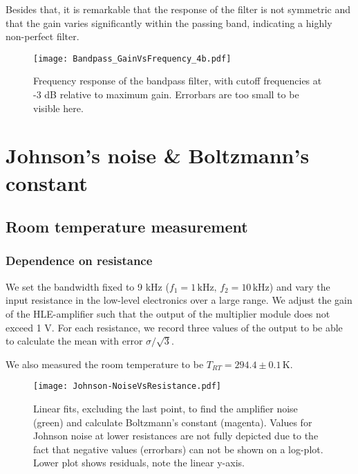 Besides that, it is remarkable that the response of the filter is not symmetric and that the gain varies significantly within the passing band, indicating a highly non-perfect filter.

\begin{figure}[H]
	\centering
	\texttt{[image: Bandpass\_GainVsFrequency\_4b.pdf]}
	\caption{Frequency response of the bandpass filter, with cutoff frequencies at -3 dB relative to maximum gain. Errorbars are too small to be visible here.}
	\label{fig:Bandpass_GainVsFrequency_4b.pdf}
\end{figure}



\clearpage
\section{Johnson's noise \& Boltzmann's constant}

\subsection{Room temperature measurement}\label{sec:RT}

\subsubsection{Dependence on resistance}\label{eq:VJ-vs-R}

We set the bandwidth fixed to 9 kHz ($f_1 = 1 \,\mathrm{kHz}, \, f_2 = 10 \,\mathrm{kHz}$) and vary the input resistance in the low-level electronics over a large range. We adjust the gain of the HLE-amplifier such that the output of the multiplier module does not exceed 1 V. For each resistance, we record three values of the output to be able to calculate the mean with error $\sigma/\sqrt{3}$.

We also measured the room temperature to be $T_{RT} = 294.4 \pm 0.1 \,\mathrm{K}$.


\begin{figure}[H]
	\centering
	\texttt{[image: Johnson-NoiseVsResistance.pdf]}
	\caption{Linear fits, excluding the last point, to find the amplifier noise (green) and calculate Boltzmann's constant (magenta). Values for Johnson noise at lower resistances are not fully depicted due to the fact that negative values (errorbars) can not be shown on a log-plot. Lower plot shows residuals, note the linear y-axis.}
	\label{fig:Johnson-NoiseVsResistance.pdf}
\end{figure}

